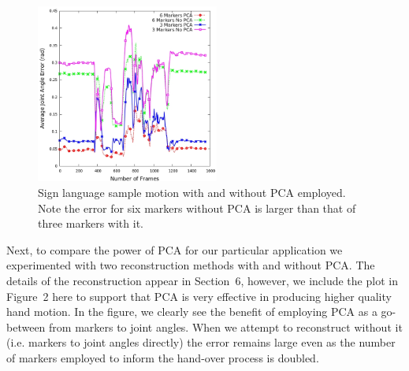 \begin{figure}[!h]
  \centering
  \includegraphics[width=6cm]{images/avgError_6_3_jangles_babySigns1.jpg}
  \caption{{\label{fig:avgError}} Sign language sample motion with and without PCA employed.  Note the
error for six markers without PCA is larger than that of three markers with it. }
\end{figure}


Next, to compare the power of PCA for our particular application we experimented with two reconstruction 
methods with and without PCA. 
The details of the reconstruction appear in Section~6, however, we include the plot in Figure~2 here to support that PCA is very effective in producing higher quality hand motion.
In the figure, we clearly see the benefit of employing PCA as a go-between from markers to joint angles.
When we attempt to reconstruct without it (i.e. markers to joint angles directly) the error remains large
even as the number of markers employed to inform the hand-over process is doubled.



\begin{figure}
  \centering
\end{figure}

